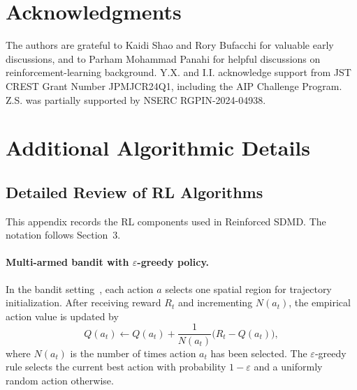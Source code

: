 \documentclass{article}
\numberwithin{equation}{section}
\theoremstyle{definition}
\begin{document}
\section*{Acknowledgments}
The authors are grateful to Kaidi Shao and Rory Bufacchi for valuable early discussions, and to Parham Mohammad Panahi for helpful discussions on reinforcement-learning background. Y.X. and I.I. acknowledge support from JST CREST Grant Number JPMJCR24Q1, including the AIP Challenge Program. Z.S. was partially supported by NSERC RGPIN-2024-04938.




\newpage
\appendix
\titleformat{\section}[hang]{\normalfont\Large\bfseries}{}{0pt}{}


\section{Additional Algorithmic Details}


\subsection{Detailed Review of RL Algorithms}\label{app:rl_review}
This appendix records the RL components used in Reinforced SDMD. The notation follows Section~3.

\paragraph{Multi-armed bandit with $\varepsilon$-greedy policy.}
In the bandit setting~\cite{slivkins2019introduction}, each action $a$ selects one spatial region for trajectory initialization. After receiving reward $R_t$ and incrementing $N(a_t)$, the empirical action value is updated by
\begin{equation*}
Q(a_t)\leftarrow Q(a_t)+\frac{1}{N(a_t)}\bigl(R_t-Q(a_t)\bigr),
\end{equation*}
where $N(a_t)$ is the number of times action $a_t$ has been selected. The $\varepsilon$-greedy rule selects the current best action with probability $1-\varepsilon$ and a uniformly random action otherwise.
\end{document}
